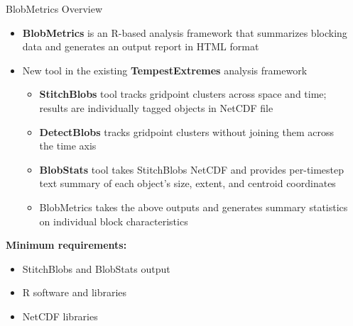 \documentclass[final]{beamer}
\newlength{\sepwid}
\newlength{\onecolwid}
\begin{document}
\begin{frame}[t]
\begin{columns}[t]
\begin{column}{\sepwid}\end{column} %

 \begin{column}{\onecolwid} %

\begin{alertblock}{BlobMetrics Overview}
\begin{itemize}
    \item \textbf{BlobMetrics} is an R-based analysis framework that summarizes blocking data and generates an output report in HTML format
    \item New tool in the existing \textbf{TempestExtremes} analysis framework \cite{ullrich_tempestextremes:_2017}
    \begin{itemize}
        \item \textbf{StitchBlobs} tool tracks gridpoint clusters across space and time; results are individually tagged objects in NetCDF file
       \item \textbf{DetectBlobs} tracks gridpoint clusters without joining them across the time axis
        \item \textbf{BlobStats} tool takes StitchBlobs NetCDF and provides per-timestep text summary of each object's size, extent, and centroid coordinates
        \item BlobMetrics takes the above outputs and generates summary statistics on individual block characteristics 
    \end{itemize}
\end{itemize}
\textbf{Minimum requirements:}\\
\begin{minipage}[h]{0.73\textwidth}
\begin{itemize}
    \item StitchBlobs and BlobStats output
    \item R software and libraries 
    \item NetCDF libraries
\end{itemize}
\end{minipage} 
\begin{minipage}[h]{0.25\textwidth}
\begin{figure}
    \centering

\end{figure}
\end{minipage}
\end{alertblock}
\end{column}
\end{columns}
\end{frame}
\end{document}
